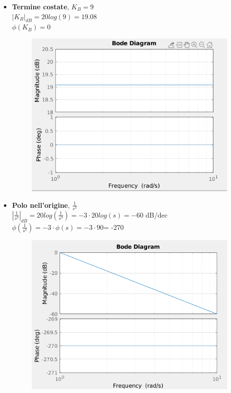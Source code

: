 \documentclass[12pt,a4paper]{article}
\begin{document}
	\begin{itemize}
		\item \textbf{Termine costate}, $K_B = 9$\vspace{5px}\\
		$|K_B|_{dB} = 20log(9) = 19.08$\\
		$\phi(K_B) = 0$\degree
		\begin{figure}[h!]
			\centering
			\includegraphics[scale=0.5]{./images/bode45_1.png}
		\end{figure}
		\item \textbf{Polo nell'origine}, $\frac{1}{s^3}$\vspace{5px}\\
		$\left|\frac{1}{s^3}\right|_{dB} = 20log\left(\frac{1}{s^3}\right) = -3 \cdot 20log(s) = -60$ dB/dec\vspace{5px}\\
		$\phi\left(\frac{1}{s^3}\right) = -3 \cdot \phi(s) = -3 \cdot 90$\degree = -270\degree
		\begin{figure}[h!]
			\centering
			\includegraphics[scale=0.5]{./images/bode45_2.png}

\end{figure}
\end{itemize}
\end{document}
